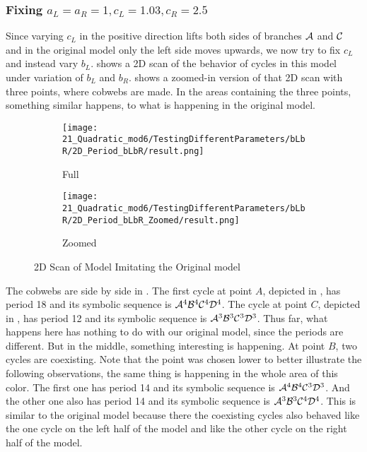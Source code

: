 \subsubsection{Fixing $a_L = a_R = 1, c_L = 1.03, c_R = 2.5$}

Since varying $c_L$ in the positive direction lifts both sides of branches $\mathcal{A}$ and $\mathcal{C}$ and in the original model only the left side moves upwards, we now try to fix $c_L$ and instead vary $b_L$.
 shows a 2D scan of the behavior of cycles in this model under variation of $b_L$ and $b_R$.
 shows a zoomed-in version of that 2D scan with three points, where cobwebs are made.
In the areas containing the three points, something similar happens, to what is happening in the original model.

\begin{figure}
	\centering
	\begin{subfigure}{0.4\textwidth}
		\centering
		\texttt{[image: 21\_Quadratic\_mod6/TestingDifferentParameters/bLbR/2D\_Period\_bLbR/result.png]}
		\caption{Full}
		\label{fig:quadratic.full.bLbR.2d.full}
	\end{subfigure}
	\begin{subfigure}{0.4\textwidth}
		\centering
		\texttt{[image: 21\_Quadratic\_mod6/TestingDifferentParameters/bLbR/2D\_Period\_bLbR\_Zoomed/result.png]}
		\caption{Zoomed}
		\label{fig:quadratic.full.bLbR.2d.z}
	\end{subfigure}
	\caption{2D Scan of Model Imitating the Original model }
\end{figure}

The cobwebs are side by side in .
The first cycle at point $A$, depicted in , has period 18 and its symbolic sequence is $\mathcal{A}^4\mathcal{B}^4\mathcal{C}^4\mathcal{D}^4$.
The cycle at point $C$, depicted in , has period 12 and its symbolic sequence is $\mathcal{A}^3\mathcal{B}^3\mathcal{C}^3\mathcal{D}^3$.
Thus far, what happens here has nothing to do with our original model, since the periods are different.
But in the middle, something interesting is happening.
At point $B$, two cycles are coexisting.
Note that the point was chosen lower to better illustrate the following observations, the same thing is happening in the whole area of this color.
The first one has period 14 and its symbolic sequence is $\mathcal{A}^4\mathcal{B}^4\mathcal{C}^3\mathcal{D}^3$.
And the other one also has period 14 and its symbolic sequence is $\mathcal{A}^3\mathcal{B}^3\mathcal{C}^4\mathcal{D}^4$.
This is similar to the original model because there the coexisting cycles also behaved like the one cycle on the left half of the model and like the other cycle on the right half of the model.

